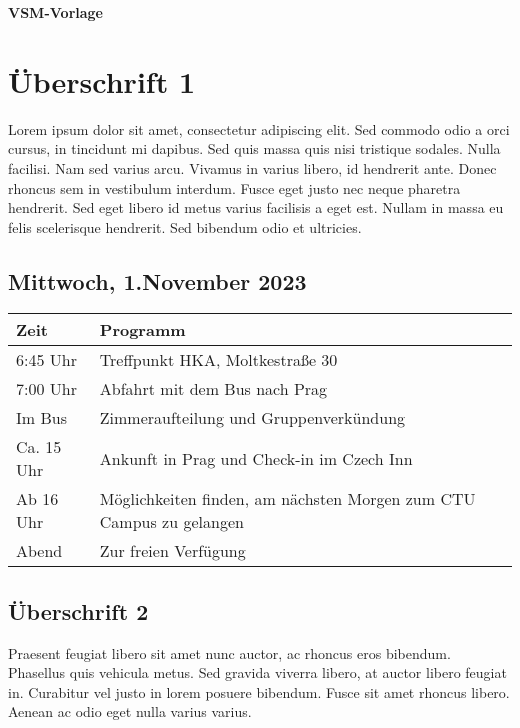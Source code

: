 \documentclass{article}
\begin{document}
\begin{center}
    {\huge \textbf{VSM-Vorlage}}
    \vspace{10pt}
\end{center}


\section*{Überschrift 1}
Lorem ipsum dolor sit amet, consectetur adipiscing elit. Sed commodo odio a orci cursus, in 
tincidunt mi dapibus. Sed quis massa quis nisi tristique sodales. Nulla facilisi. Nam sed varius 
arcu. Vivamus in varius libero, id hendrerit ante. Donec rhoncus sem in vestibulum interdum. 
Fusce eget justo nec neque pharetra hendrerit. Sed eget libero id metus varius facilisis a eget 
est. Nullam in massa eu felis scelerisque hendrerit. Sed bibendum odio et ultricies. 

\subsection*{Mittwoch, 1.November 2023}

\begin{table}[h]
    \begin{tabularx}{\textwidth}{l|X}
        Zeit & Programm \\
        \hline
        6:45 Uhr & Treffpunkt HKA, Moltkestraße 30 \\
        7:00 Uhr & Abfahrt mit dem Bus nach Prag \\
        Im Bus & Zimmeraufteilung und Gruppenverkündung \\
        Ca. 15 Uhr & Ankunft in Prag und Check-in im Czech Inn \\
        Ab 16 Uhr & Möglichkeiten finden, am nächsten Morgen zum CTU Campus zu gelangen \\
        Abend & Zur freien Verfügung
    \end{tabularx}
    \end{table}

\subsection*{Überschrift 2}
Praesent feugiat libero sit amet nunc auctor, ac rhoncus eros bibendum. Phasellus quis vehicula 
metus. Sed gravida viverra libero, at auctor libero feugiat in. Curabitur vel justo in lorem 
posuere bibendum. Fusce sit amet rhoncus libero. Aenean ac odio eget nulla varius varius.
\end{document}
